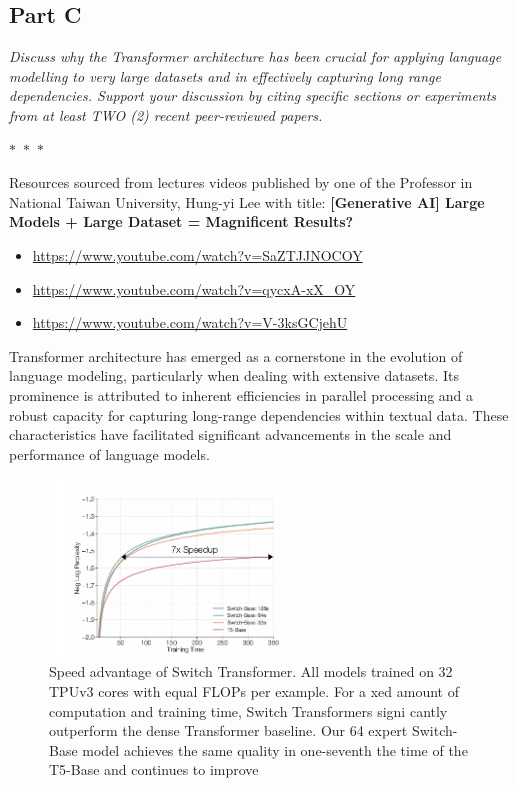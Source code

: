 \subsection*{Part C}

\textit{Discuss why the Transformer architecture has been crucial for applying language modelling to very large datasets and in effectively capturing long range dependencies. Support your discussion by citing specific sections or experiments from at least TWO (2) recent peer-reviewed papers.}

\begin{center}
  $\ast$~$\ast$~$\ast$
\end{center}

Resources sourced from lectures videos published by one of the Professor in National Taiwan University, Hung-yi Lee with title: \textbf{[Generative AI] Large Models + Large Dataset = Magnificent Results?}

\begin{itemize}
    \item \url{https://www.youtube.com/watch?v=SaZTJJNOCOY}
    \item \url{https://www.youtube.com/watch?v=qycxA-xX_OY}
    \item \url{https://www.youtube.com/watch?v=V-3ksGCjehU}
\end{itemize}

Transformer architecture has emerged as a cornerstone in the evolution of language modeling, particularly when dealing with extensive datasets. Its prominence is attributed to inherent efficiencies in parallel processing and a robust capacity for capturing long-range dependencies within textual data. These characteristics have facilitated significant advancements in the scale and performance of language models.

\begin{figure}[htpb]
    \centering
    \includegraphics[width=0.6\textwidth]{../images/image-3.png} %
    \caption{Speed advantage of Switch Transformer. All models trained on 32 TPUv3 cores with equal FLOPs per example. For a xed amount of computation and training time, Switch Transformers signi cantly outperform the dense Transformer baseline. Our 64 expert Switch-Base model achieves the same quality in one-seventh the time of the T5-Base and continues to improve}
    \label{fig:switch}
\end{figure}

